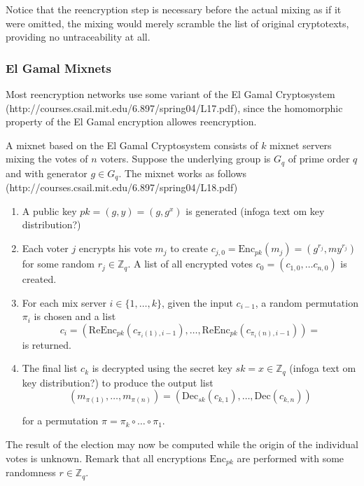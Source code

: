 Notice that the reencryption step is necessary before the actual
mixing as if it were omitted, the mixing would merely scramble the
list of original cryptotexts, providing no untraceability at all.

\subsubsection{El Gamal Mixnets}

Most reencryption networks use some variant of the El Gamal
Cryptosystem (http://courses.csail.mit.edu/6.897/spring04/L17.pdf),
since the homomorphic property of the El Gamal encryption allowes
reencryption.

A mixnet based on the El Gamal Cryptosystem consists of $k$ mixnet
servers mixing the votes of $n$ voters. Suppose the underlying group
is $G_q$ of prime order $q$ and with generator $g \in G_q$. The mixnet
works as follows \\
(http://courses.csail.mit.edu/6.897/spring04/L18.pdf)

\begin{enumerate}
\item A public key $pk = (g,y) = (g, g^x)$ is generated (infoga text om key distribution?)
\item Each voter $j$ encrypts his vote $m_j$ to create $c_{j,0} =
  \mathrm{Enc}_{pk}(m_j) = (g^{r_j},my^{r_j})$ for some random $r_j
  \in \mathbb{Z}_q$.  A list of all encrypted votes $c_0 = \left(
  c_{1,0}, \hdots c_{n,0}\right)$ is created.
\item For each mix server $i \in \{1,\hdots, k\}$, given the input
  $c_{i-1}$, a random permutation $\pi _i$ is chosen and a list 
  $$ 
  c_i =\left(\mathrm{ReEnc}_{pk}(c_{\pi_i(1),i-1}), \hdots,
  \mathrm{ReEnc}_{pk}(c_{\pi_i(n), i-1})\right) =
  $$
  is returned.
\item The final list $c_k$ is decrypted using the secret key $sk = x
  \in \mathbb{Z}_q$ (infoga text om key distribution?) to produce
  the output list
 $$ 
  (m_{\pi (1)}, \hdots , m_{\pi (n)}) =
  \left(\mathrm{Dec}_{sk}(c_{k,1}), \hdots, \mathrm{Dec}(c_{k,n})\right)
  $$
  
  for a permutation $\pi = \pi_k \circ \hdots \circ \pi_1$.
\end{enumerate}

The result of the election may now be computed while the origin of the
individual votes is unknown. Remark that all encryptions
$\mathrm{Enc}_{pk}$ are performed with some randomness $r \in
\mathbb{Z}_q$.

